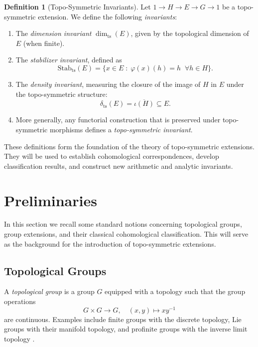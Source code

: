 \documentclass[11pt,a4paper]{article}
\theoremstyle{plain}
\theoremstyle{definition}
\newtheorem{definition}[theorem]{Definition}
\theoremstyle{remark}
\begin{document}
	\begin{definition}[Topo-Symmetric Invariants]
		Let $1 \to H \to E \to G \to 1$ be a topo-symmetric extension.
		We define the following \emph{invariants}:
		\begin{enumerate}
			\item The \emph{dimension invariant} $\dim_{\mathrm{ts}}(E)$, given by the topological dimension of $E$ (when finite).
			\item The \emph{stabilizer invariant}, defined as
			\[
			\mathrm{Stab}_{\mathrm{ts}}(E) = \{ x \in E \;:\; \varphi(x)(h) = h \;\;\forall h \in H \}.
			\]
			\item The \emph{density invariant}, measuring the closure of the image of $H$ in $E$ under the topo-symmetric structure:
			\[
			\delta_{\mathrm{ts}}(E) = \overline{\iota(H)} \subseteq E.
			\]
			\item More generally, any functorial construction that is preserved under topo-symmetric morphisms 
			defines a \emph{topo-symmetric invariant}.
		\end{enumerate}
	\end{definition}
	
	\medskip
	
	These definitions form the foundation of the theory of topo-symmetric extensions. 
	They will be used to establish cohomological correspondences, develop classification results, 
	and construct new arithmetic and analytic invariants.
	
	\section{Preliminaries}
	
	In this section we recall some standard notions concerning topological groups, group extensions, 
	and their classical cohomological classification. 
	This will serve as the background for the introduction of topo-symmetric extensions.
	
	\subsection{Topological Groups}
	A \emph{topological group} is a group $G$ equipped with a topology such that the group operations
	\[
	G \times G \to G, \quad (x,y) \mapsto xy^{-1}
	\]
	are continuous. 
	Examples include finite groups with the discrete topology, Lie groups with their manifold topology, and profinite groups with the inverse limit topology \cite{HewittRoss1979, Serre1979}.
	
\end{document}
